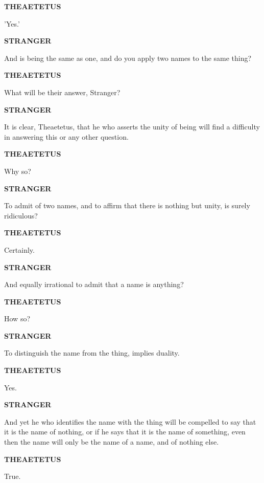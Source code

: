 \documentclass[11pt,letter]{article}
\begin{document}
\par \textbf{THEAETETUS}
\par   'Yes.'

\par \textbf{STRANGER}
\par   And is being the same as one, and do you apply two names to the same thing?

\par \textbf{THEAETETUS}
\par   What will be their answer, Stranger?

\par \textbf{STRANGER}
\par   It is clear, Theaetetus, that he who asserts the unity of being will find a difficulty in answering this or any other question.

\par \textbf{THEAETETUS}
\par   Why so?

\par \textbf{STRANGER}
\par   To admit of two names, and to affirm that there is nothing but unity, is surely ridiculous?

\par \textbf{THEAETETUS}
\par   Certainly.

\par \textbf{STRANGER}
\par   And equally irrational to admit that a name is anything?

\par \textbf{THEAETETUS}
\par   How so?

\par \textbf{STRANGER}
\par   To distinguish the name from the thing, implies duality.

\par \textbf{THEAETETUS}
\par   Yes.

\par \textbf{STRANGER}
\par   And yet he who identifies the name with the thing will be compelled to say that it is the name of nothing, or if he says that it is the name of something, even then the name will only be the name of a name, and of nothing else.

\par \textbf{THEAETETUS}
\par   True.
\end{document}
